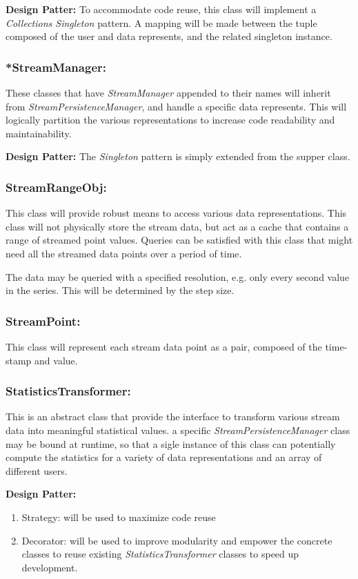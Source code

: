 \textbf{Design Patter:}
To accommodate code reuse, this class will implement a \textit{Collections Singleton} pattern. A mapping will be made between the tuple composed of the user and data represents, and the related singleton instance.

\subsubsection*{\textbf{*StreamManager:}}
These classes that have \textit{StreamManager} appended to their names will inherit from \textit{StreamPersistenceManager}, and handle a specific data represents. This will logically partition the various representations to increase code readability and maintainability.

\textbf{Design Patter:}
The \textit{Singleton} pattern is simply extended from the supper class.


\subsubsection*{\textbf{StreamRangeObj:}}
This class will provide robust means to access various data representations. This class will not physically store the stream data, but act as a cache that contains a range of streamed point values. Queries can be satisfied with this class that might need all the streamed data points over a period of time.

The data may be queried with a specified resolution, e.g. only every second value in the series. This will be determined by the step size.


\subsubsection*{\textbf{StreamPoint:}}
This class will represent each stream data point as a pair, composed of the time-stamp and value.


\subsubsection*{\textbf{StatisticsTransformer:}}
This is an abstract class that provide the interface to transform various stream data into meaningful statistical values. a specific \textit{StreamPersistenceManager} class may be bound at runtime, so that a sigle instance of this class can potentially compute the statistics for a variety of data representations and an array of different users.

\textbf{Design Patter:}
\begin{enumerate}
	\item Strategy: will be used to maximize code reuse
	\item Decorator: will be used to improve modularity and empower the concrete classes to reuse existing \textit{StatisticsTransformer} classes to speed up development.
\end{enumerate}













